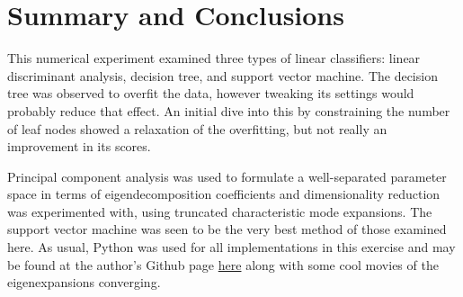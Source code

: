 \documentclass{article}
\begin{document}

\section{Summary and Conclusions}
This numerical experiment examined three types of linear classifiers: linear discriminant analysis, decision tree, and support vector machine. The decision tree was observed to overfit the data, however tweaking its settings would probably reduce that effect. An initial dive into this by constraining the number of leaf nodes showed a relaxation of the overfitting, but not really an improvement in its scores.

Principal component analysis was used to formulate a well-separated parameter space in terms of eigendecomposition coefficients and dimensionality reduction was experimented with, using truncated characteristic mode expansions. The support vector machine was seen to be the very best method of those examined here. As usual, Python was used for all implementations in this exercise and may be found at the author's Github page \href{https://github.com/crewsdw/amath582}{here} along with some cool movies of the eigenexpansions converging.



\end{document}

